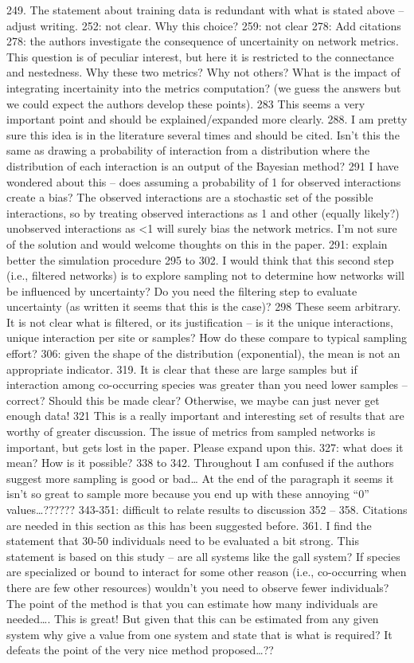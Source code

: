 249.  The statement about training data is redundant with what is stated above – adjust writing.
252: not clear. Why this choice?
259: not clear
278: Add citations
278: the authors investigate the consequence of uncertainity on network metrics. This question is of peculiar interest, but here it is restricted to the connectance and nestedness. Why these two metrics? Why not others? What is the impact of integrating incertainity into the metrics computation? (we guess the answers but we could expect the authors develop these points).
283 This seems a very important point and should be explained/expanded more clearly.
288.  I am pretty sure this idea is in the literature several times and should be cited.  Isn’t this the same as drawing a probability of interaction from a distribution where the distribution of each interaction is an output of the Bayesian method?
291 I have wondered about this – does assuming a probability of 1 for observed interactions create a bias? The observed interactions are a stochastic set of the possible interactions, so by treating observed interactions as 1 and other (equally likely?) unobserved interactions as <1 will surely bias the network metrics. I’m not sure of the solution and would welcome thoughts on this in the paper.
291: explain better the simulation procedure
295 to 302.  I would think that this second step (i.e., filtered networks) is to explore sampling not to determine how networks will be influenced by uncertainty?  Do you need the filtering step to evaluate uncertainty (as written it seems that this is the case)?
298 These seem arbitrary. It is not clear what is filtered, or its justification – is it the unique interactions, unique interaction per site or samples? How do these compare to typical sampling effort?
306: given the shape of the distribution (exponential), the mean is not an appropriate indicator.
319.  It is clear that these are large samples but if interaction among co-occurring species was greater than you need lower samples – correct?  Should this be made clear?  Otherwise, we maybe can just never get enough data!
321 This is a really important and interesting set of results that are worthy of greater discussion. The issue of metrics from sampled networks is important, but gets lost in the paper. Please expand upon this.
327: what does it mean? How is it possible?
338 to 342.  Throughout I am confused if the authors suggest more sampling is good or bad…  At the end of the paragraph it seems it isn’t so great to sample more because you end up with these annoying “0” values…??????
343-351: difficult to relate results to discussion
352 – 358.  Citations are needed in this section as this has been suggested before.
361.  I find the statement that 30-50 individuals need to be evaluated a bit strong.  This statement is based on this study – are all systems like the gall system?  If species are specialized or bound to interact for some other reason (i.e., co-occurring when there are few other resources) wouldn’t you need to observe fewer individuals?  The point of the method is that you can estimate how many individuals are needed…. This is great!  But given that this can be estimated from any given system why give a value from one system and state that is what is required?  It defeats the point of the very nice method proposed…??

